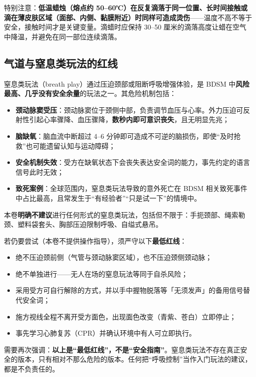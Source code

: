 \documentclass[12pt,UTF8]{ctexbook}
\begin{document}
特别注意：\textbf{低温蜡烛（熔点约 50--60℃）在反复滴落于同一位置、长时间接触或滴在薄皮肤区域（面部、内侧、黏膜附近）时同样可造成烫伤}——温度不高不等于安全，接触时间才是关键变量。滴蜡时应保持 30--50 厘米的滴落高度让蜡在空气中降温，并避免在同一部位连续滴落。

\subsection{气道与窒息类玩法的红线}

窒息类玩法（breath play）通过压迫颈部或阻断呼吸增强体验，是 BDSM 中\textbf{风险最高、几乎没有安全余量}的玩法之一。其危险机制包括：

\begin{itemize}
\item \textbf{颈动脉窦受压}：颈动脉窦位于颈侧中部，负责调节血压与心率。外力压迫可反射性引起心率骤降、血压骤降，\textbf{数秒内即可意识丧失}，且无明显先兆；
\item \textbf{脑缺氧}：脑血流中断超过 4--6 分钟即可造成不可逆的脑损伤，即使“及时抢救”也可能遗留认知与运动障碍；
\item \textbf{安全机制失效}：受方在缺氧状态下会丧失表达安全词的能力，事先约定的语言信号此时无效；
\item \textbf{致死案例}：全球范围内，窒息类玩法导致的意外死亡在 BDSM 相关致死事件中占比最高，且常发生于“有经验者”“只是试一下”的情境中。
\end{itemize}

本卷\textbf{明确不建议}进行任何形式的窒息类玩法，包括但不限于：手扼颈部、绳索勒颈、塑料袋套头、胸部压迫限制呼吸、自缢式悬吊。

若仍要尝试（本卷不提供操作指导），须严守以下\textbf{最低红线}：

\begin{itemize}
\item 绝不压迫颈前侧（气管与颈动脉窦区域），也不压迫颈侧颈动脉；
\item 绝不单独进行——无人在场的窒息玩法等同于自杀风险；
\item 采用受方可自行解除的方式，并以手中握物脱落等「无须发声」的备用信号替代安全词；
\item 施方视线全程不离开受方面色，出现面色改变（青紫、苍白）立即停止；
\item 事先学习心肺复苏（CPR）并确认环境中有人可立即执行。
\end{itemize}

需要再次强调：\textbf{以上是“最低红线”，不是“安全指南”}。窒息类玩法不存在真正安全的版本，只有相对不那么危险的版本。任何把“呼吸控制”当作入门玩法的建议，都是不负责任的。
\end{document}
